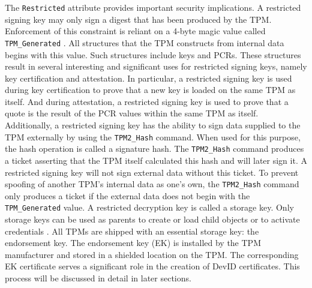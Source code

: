 \documentclass[runningheads]{llncs}
\begin{document}
The \verb|Restricted| attribute provides important security implications. A restricted signing key may only sign a digest that has been produced by the TPM. Enforcement of this constraint is reliant on a 4-byte magic value called \verb|TPM_Generated| \cite{TPMSpec}. All structures that the TPM constructs from internal data begins with this value. Such structures include keys and PCRs. These structures result in several interesting and significant uses for restricted signing keys, namely key certification and attestation. In particular, a restricted signing key is used during key certification to prove that a new key is loaded on the same TPM as itself. And during attestation, a restricted signing key is used to prove that a quote is the result of the PCR values within the same TPM as itself. Additionally, a restricted signing key has the ability to sign data supplied to the TPM externally by using the \verb|TPM2_Hash| command. When used for this purpose, the hash operation is called a signature hash. The \verb|TPM2_Hash| command produces a ticket asserting that the TPM itself calculated this hash and will later sign it. A restricted signing key will not sign external data without this ticket. To prevent spoofing of another TPM's internal data as one's own, the \verb|TPM2_Hash| command only produces a ticket if the external data does not begin with the \verb|TPM_Generated| value.
A restricted decryption key is called a storage key. Only storage keys can be used as parents to create or load child objects or to activate credentials \cite{PracticalGuide}. All TPMs are shipped with an essential storage key: the endorsement key. The endorsement key (EK) is installed by the TPM manufacturer and stored in a shielded location on the TPM. The corresponding EK certificate serves a significant role in the creation of DevID certificates. 
This process will be discussed in detail in later sections.
\end{document}
